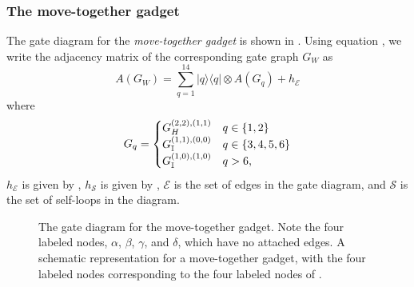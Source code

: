 \documentclass[../thesis-main/thesis-main]{subfiles}
\begin{document}
\subsubsection{The move-together gadget}



The gate diagram for the \emph{move-together gadget} is shown in . Using equation , we write the adjacency matrix of the corresponding gate graph $G_W$ as 
\begin{equation}
A(G_W)=\sum_{q=1}^{14}|q\rangle\langle q|\otimes A(G_q)+h_{\mathcal{E}}\label{eq:move_together_adj}
\end{equation}
where
\begin{equation}
  G_q = \begin{cases}
    G_H^{(2,2),(1,1)} & q \in \{1,2\}\\
    G_{\mathbb{I}}^{(1,1),(0,0)} & q\in \{3,4,5,6\}\\
    G_{\mathbb{I}}^{(1,0),(1,0)} & q > 6,
  \end{cases}
\end{equation}
$h_{\mathcal{E}}$ is given by , $h_{\mathcal{S}}$ is given by ,  $\mathcal{E}$ is the set of edges in the gate diagram, and $\mathcal{S}$ is the set of self-loops in the diagram.

\begin{figure}
\centering 
{}
\hspace{1cm}
\caption{ The gate diagram for the move-together gadget.  Note the four labeled nodes, $\alpha$, $\beta$, $\gamma$, and $\delta$, which have no attached edges.   A schematic representation for a move-together gadget, with the four labeled nodes corresponding to the four labeled nodes of . \label{fig:W_gadget}} 
\end{figure}
\end{document}
